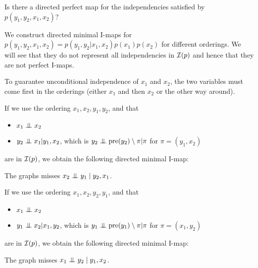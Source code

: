 \begin{exenumerate}
\begin{solution}
  \end{solution}
\item Is there a directed perfect map for the independencies
  satisfied by $p(y_1,y_2,x_1,x_2)$?
   
   \begin{solution} We construct directed minimal I-maps for
   $p(y_1,y_2,x_1,x_2) = p(y_1, y_2 | x_1, x_2)p(x_1) p(x_2)$ for different
   orderings. We will see that they do not represent all independencies in
   $\mathcal{I}(p)$ and hence that they are not perfect I-maps.

   To guarantee unconditional independence of $x_1$ and $x_2$, the two
   variables must come first in the orderings (either $x_1$ and then
   $x_2$ or the other way around).
   
   If we use the ordering $x_1,x_2,y_1,y_2$, and that 
   \begin{itemize}
   \item $x_1 \mathrel{\perp\mspace{-10mu}\perp} x_2$
   \item $y_2 \mathrel{\perp\mspace{-10mu}\perp} x_1 | y_1, x_2$, which is $y_2 \mathrel{\perp\mspace{-10mu}\perp} \mathrm{pre}(y_2) \setminus \pi | \pi$ for $\pi = (y_1, x_2)$
   \end{itemize}
   are in $\mathcal{I}(p)$, we obtain the following directed minimal I-map:
   \begin{center}
   \end{center}
   The graphs misses $x_2 \mathrel{\perp\mspace{-10mu}\perp} y_1 \mid y_2, x_1$.
   
   If we use the ordering $x_1,x_2,y_2,y_1$, and that
   \begin{itemize}
   \item $x_1 \mathrel{\perp\mspace{-10mu}\perp} x_2$ 
   \item $y_1 \mathrel{\perp\mspace{-10mu}\perp} x_2 | x_1, y_2$, which is $y_1 \mathrel{\perp\mspace{-10mu}\perp} \mathrm{pre}(y_1) \setminus \pi | \pi$ for $\pi = (x_1, y_2)$
   \end{itemize}
   are in $\mathcal{I}(p)$, we obtain the following directed minimal I-map:
    \begin{center}
    \end{center}
    The graph misses $x_1\mathrel{\perp\mspace{-10mu}\perp} y_2 \mid y_1, x_2$.
    

\end{solution}
\end{exenumerate}
